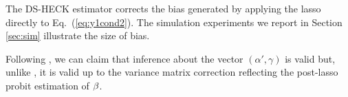 \documentclass[11pt]{article}
\begin{document}
The DS-HECK estimator corrects the bias generated by applying the lasso directly to Eq.~(\ref{eq:y1cond2}). The simulation experiments we report in Section \ref{sec:sim} illustrate the size of bias.

Following \cite{bellonichernozhukovhansen2014}, we can claim that inference about the vector $(\alpha', \gamma)$ is valid but, unlike \cite{bellonichernozhukovhansen2014}, it is valid up to the variance matrix correction reflecting the post-lasso probit estimation of $\mathbf{\beta}$. 

\begin{comment}

\vskip 1cm

	\begin{algorithm}[H]\label{algo:dsheckman}
\caption{The {\dsheck} estimator}
\begin{enumerate}
	\item {\bf Choose the proxy variables}.  Use Lasso to set $\xvar$ as
	variables to predict the inverse mills ratio. Notice that we can impose
	$\xvar$ to always include $\xvar_1$ when use lasso to select variables. 

	\item \label{algo:dsheck_step2} {\bf Obtain consistent estimates
	$\check{\betab}$ for $\betab$}.  For details, see the double selection
	probit in Algorithm \ref{algo:dsprobit}. 

	\item {\bf Predict inverse mills ratio} $\widehat{\lambda(\xvar\betab)}
	= \phi(\xvar\check{\betab})/\Phi(\xvar\check{\betab})$.

	\item {\bf Obtain consistent estimates $\widehat{\alpha}$ and
	$\widehat{\gamma}$} by using double selection linear regression of $y_1$
	on $\xvar_1$, $\widehat{\lambda(\xvar\betab)}$, and $\zvar$ as nuisance
	parameter.  For details, see Algorithm \ref{algo:dsregress}.
	\label{algo:dsheck_step4}

	\item {\bf Adjust variance} due to the estimation of $\betab$. For
	details, see Algorithm \ref{algo:adjv}.
	\label{algo:dsheck_step5}
	\end{enumerate}

\end{algorithm}





\end{comment}
\end{document}
